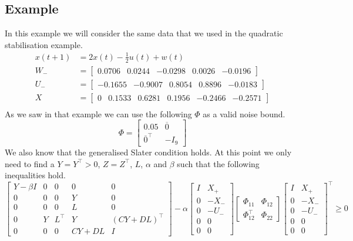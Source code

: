 \subsection{Example}
In this example we will consider the same data that we used in the quadratic stabilisation example.
\begin{align*}
	x(t+1) &= 2x(t) - \frac{1}{2}u(t) + w(t) \\
	W_- &= \begin{bmatrix}  0.0706 &  0.0244 & -0.0298 & 0.0026 & -0.0196 \end{bmatrix} \\
	U_- &= \begin{bmatrix} -0.1655 & -0.9007 &  0.8054 & 0.8896 & -0.0183 \end{bmatrix} \\
	X   &= \begin{bmatrix}     0   &  0.1533 &  0.6281 & 0.1956 & -0.2466 & -0.2571 \end{bmatrix} \\
\end{align*}
As we saw in that example we can use the following $\Phi$ as a valid noise bound.
\begin{equation*}
\Phi = \begin{bmatrix} 0.05 & \overline{0} \\ \overline{0}^\top & -I_9 \end{bmatrix}
\end{equation*}
We also know that the generalised Slater condition holds. At this point we only need to find a $Y = Y^\top > 0$, $Z = Z^\top$, $L$, $\alpha$ and $\beta$ such that the following inequalities hold.
\begin{equation*}
\begin{bmatrix}
Y - \beta I & 0 & 0 & 0 & 0 \\
0 & 0 & 0 & Y & 0 \\
0 & 0 & 0 & L & 0 \\
0 & Y & L^\top & Y & (CY + DL)^\top \\
0 & 0 & 0 & CY + DL & I 
\end{bmatrix} - \alpha
\begin{bmatrix} I&X_+ \\ 0 & -X_- \\ 0&-U_- \\ 0&0 \\ 0&0 \end{bmatrix}
\begin{bmatrix} \Phi_{11} & \Phi_{12} \\ \Phi_{12}^\top & \Phi_{22} \end{bmatrix}
\begin{bmatrix} I&X_+ \\ 0 & -X_- \\ 0&-U_- \\ 0&0 \\ 0&0 \end{bmatrix}^\top \geq 0
\end{equation*}

